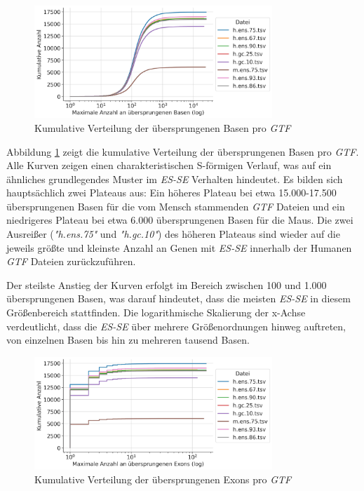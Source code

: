 \documentclass[12pt]{article}
\begin{document}
\begin{figure}[htpb]
	\centering
	\includegraphics[width=0.8\textwidth]{./plots/skipped_bases.jpg}
	\caption{Kumulative Verteilung der übersprungenen Basen pro \textit{GTF}}
	\label{fig:-plots-skipped_bases-jpg}
\end{figure}


Abbildung \ref{fig:-plots-skipped_bases-jpg} zeigt die kumulative Verteilung der übersprungenen Basen pro \textit{GTF}.
Alle Kurven zeigen einen charakteristischen S-förmigen Verlauf, was auf ein ähnliches grundlegendes Muster im \textit{ES-SE} Verhalten
hindeutet. Es bilden sich hauptsächlich zwei Plateaus aus:
Ein höheres Plateau bei etwa 15.000-17.500 übersprungenen Basen für die vom Mensch stammenden \textit{GTF} Dateien
und ein niedrigeres Plateau bei etwa 6.000 übersprungenen Basen für die Maus.
Die zwei Ausrei\ss er (\textit{"h.ens.75"} und \textit{"h.gc.10"}) des höheren Plateaus sind wieder auf die jeweils
grö\ss te und kleinste Anzahl an Genen mit \textit{ES-SE} innerhalb der Humanen \textit{GTF} Dateien zurückzuführen.

Der steilste Anstieg der Kurven erfolgt im Bereich zwischen 100 und 1.000 übersprungenen Basen, was darauf hindeutet,
dass die meisten \textit{ES-SE} in diesem Größenbereich stattfinden.
Die logarithmische Skalierung der x-Achse verdeutlicht, dass die \textit{ES-SE} über mehrere Größenordnungen hinweg auftreten,
von einzelnen Basen bis hin zu mehreren tausend Basen.

\begin{figure}[htpb]
	\centering
	\includegraphics[width=0.8\textwidth]{./plots/skipped_exons.jpg}
	\caption{Kumulative Verteilung der übersprungenen Exons pro \textit{GTF}}
	\label{fig:-plots-skipped_exons-jpg}
\end{figure}
\end{document}
